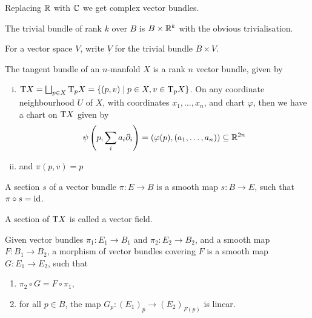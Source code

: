 \begin{remark}
    Replacing \(\mathbb{R}\) with \(\mathbb{C}\) we get complex vector bundles.
\end{remark}

\begin{definition}
     The trivial bundle of rank \(k\) over \(B\) is \(B \times \mathbb{R}^k\) with the obvious trivialisation.
\end{definition}

\begin{notation}
    For a vector space \(V\), write \(\underline{V}\) for the trivial bundle \(B \times V\).
\end{notation}

\begin{definition}

    The tangent bundle of an \(n\)-manfold \(X\) is a rank \(n\) vector bundle, given by

    \begin{enumerate}[(i)]
        \item \(\mathrm{T} X = \bigsqcup_{p \in X}\mathrm{T}_p X = \{(p, v) \mid p \in X, v \in \mathrm{T}_p X\}\). On any coordinate neighbourhood \(U\) of \(X\), with coordinates \(x_1, \dots, x_n\), and chart \(\varphi\), then we have a chart on \(\mathrm{T} X\) given by
        \[\psi\left(p, \sum_i a_i \partial_i\right) = (\varphi(p), (a_1, \dots, a_n)) \subseteq \mathbb{R}^{2n}\]
        \item and \(\pi(p, v) = p\)
    \end{enumerate}
\end{definition}

\begin{definition}
    [section] A section \(s\) of a vector bundle \(\pi : E \to B\) is a smooth map \(s : B \to E\), such that \(\pi \circ s = \operatorname{id}\).
\end{definition}

\begin{definition}
     A section of \(\mathrm{T} X\) is called a vector field.
\end{definition}

\begin{definition}

    Given vector bundles \(\pi_1 : E_1 \to B_1\) and \(\pi_2 : E_2 \to B_2\), and a smooth map \(F : B_1 \to B_2\), a morphism of vector bundles covering \(F\) is a smooth map \(G : E_1 \to E_2\), such that

    \begin{enumerate}
        \item \(\pi_2 \circ G = F \circ \pi_1\),
        \item for all \(p \in B\), the map \(G_p : (E_1)_p \to (E_2)_{F(p)}\) is linear.
    \end{enumerate}
\end{definition}

